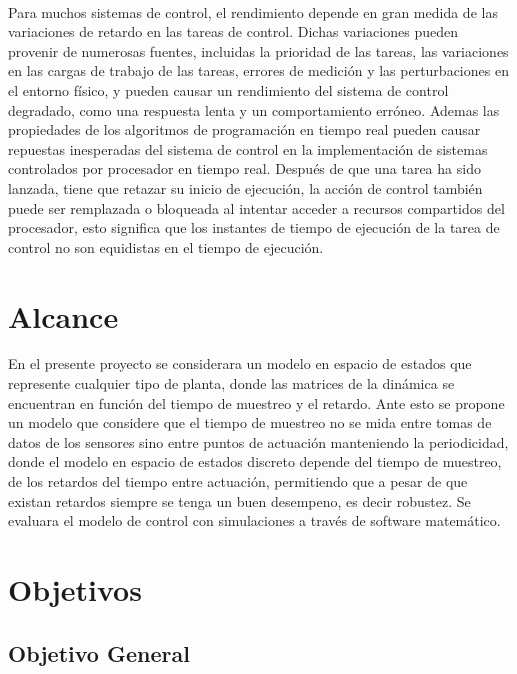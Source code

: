 \documentclass[12pt,a4paper]{book}
\begin{document}
\hfill \break\\

\begin{normalsize}
Para muchos sistemas de control, el rendimiento depende en gran medida de las variaciones de retardo en las tareas de control. Dichas variaciones pueden provenir de numerosas fuentes, incluidas la prioridad de las tareas, las variaciones en las cargas de trabajo de las tareas, errores de medici\'on y las perturbaciones en el entorno f\'isico, y pueden causar un rendimiento del sistema de control degradado, como una respuesta lenta y un comportamiento err\'oneo. Ademas las propiedades de los algoritmos de programaci\'on en tiempo real pueden causar repuestas inesperadas del sistema de control en la implementaci\'on de sistemas controlados por procesador en tiempo real. Despu\'es de que una tarea ha sido lanzada, tiene que retazar su inicio de ejecuci\'on, la acci\'on de control tambi\'en puede ser remplazada o bloqueada al intentar acceder a recursos compartidos del procesador, esto significa que los instantes de tiempo de ejecuci\'on de la tarea de control no son equidistas en el tiempo  de ejecuci\'on.
\end{normalsize}


\section{Alcance}
\begin{normalsize}
En el presente proyecto se considerara un modelo en espacio de estados que represente cualquier tipo de planta, donde las matrices de la din\'amica se encuentran en funci\'on del tiempo de muestreo y el retardo.  Ante esto se propone un modelo que considere que el tiempo de muestreo no se mida entre tomas de datos de los sensores sino entre puntos de actuaci\'on manteniendo la periodicidad, donde el modelo en espacio de estados discreto depende del tiempo de muestreo, de los retardos del tiempo entre actuaci\'on, permitiendo que a pesar de que existan retardos siempre se tenga un buen desempe\-no, es decir robustez. Se evaluara el modelo de control con simulaciones a trav\'es de software matem\'atico.
\end{normalsize}

\section{Objetivos}

\subsection{Objetivo General}
\end{document}
